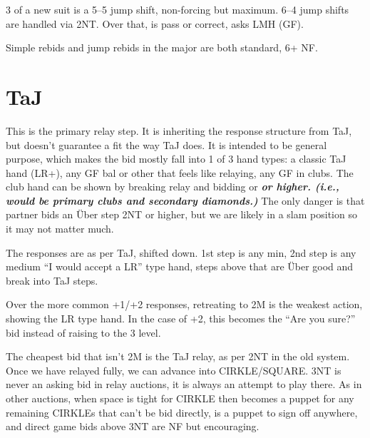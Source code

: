 \documentclass[tom-ari]{subfile}
\begin{document}
	3 of a new suit is a 5--5 jump shift, non-forcing but maximum. 6--4 jump shifts are handled via 2NT. Over that,  is pass or correct,  asks LMH (GF).
	
	Simple rebids and jump rebids in the major are both standard, 6+ NF.
		
	\section[2C TaJ]{ TaJ}
	
	This is the primary relay step.  It is inheriting the response structure from TaJ, but doesn't guarantee a fit the way TaJ does.  It is intended to be general purpose, which makes the bid mostly fall into 1 of 3 hand types:  a classic TaJ hand (LR+), any GF bal or other that feels like relaying, any GF in clubs.  The club hand can be shown by breaking relay and bidding  or \textbf{\textit{or higher. (i.e.,  would be primary clubs and secondary diamonds.)}} The only danger is that partner bids an \"Uber step 2NT or higher, but we are likely in a slam position so it may not matter much.
	
	\reversemarginpar
	
	The responses are as per TaJ, shifted down.  1st step is any min, 2nd step is any medium ``I would accept a LR'' type hand, steps above that are \"Uber good and break into TaJ steps.
	
	Over the more common +1/+2 responses, retreating to 2M is the weakest action, showing the LR type hand.  In the case of +2, this becomes the ``Are you sure?'' bid instead of raising to the 3 level.
	
	The cheapest bid that isn't 2M is the TaJ relay, as per 2NT in the old system.  Once we have relayed fully, we can advance into CIRKLE/SQUARE. 3NT is never an asking bid in relay auctions, it is always an attempt to play there. As in other auctions, when space is tight for CIRKLE then  becomes a puppet for any remaining CIRKLEs that can't be bid directly,  is a puppet to sign off anywhere, and direct game bids above 3NT are NF but encouraging.
\end{document}
